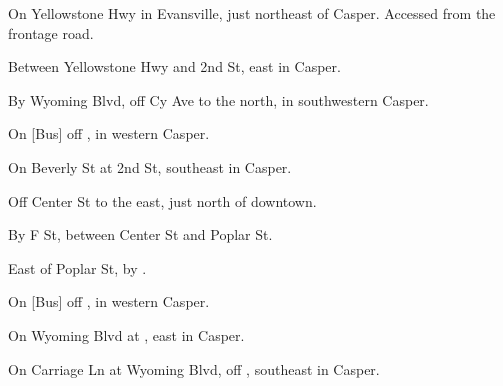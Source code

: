

\begin{LocationList}

On Yellowstone Hwy in Evansville, just northeast of Casper. Accessed from the frontage road.

\Location{\GarageHQ \Garage}
Between Yellowstone Hwy and 2nd St, east in Casper.

By Wyoming Blvd, off  Cy Ave to the north, in southwestern Casper.

On [Bus] off  , in western Casper.

On Beverly St at 2nd St, southeast in Casper.

Off Center St to the east, just north of downtown.

\Location{\RecruitmentAgency \Recruitment}
By F St, between Center St and Poplar St.

East of  Poplar St, by  .

On [Bus] off  , in western Casper.

\Location{\TruckStop \Gas \Rest \Weigh}
On Wyoming Blvd at  , east in Casper.

On Carriage Ln at Wyoming Blvd, off  , southeast in Casper.

\end{LocationList}
